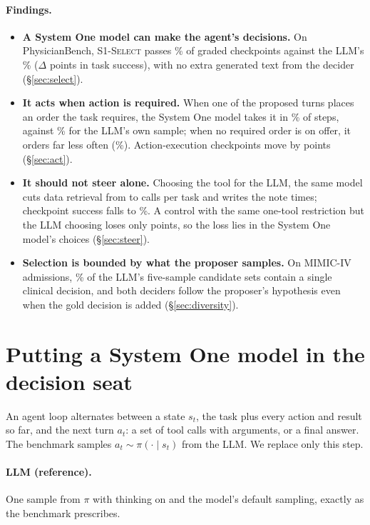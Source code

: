 \documentclass[11pt]{article}
\newcommand{\llm}{\textsc{LLM}}
\newcommand{\sel}{\textsc{S1-Select}}
\begin{document}
\paragraph{Findings.}
\begin{itemize}[leftmargin=*,itemsep=2pt,topsep=2pt]
  \item \textbf{A System One model can make the agent's decisions.} On PhysicianBench, \sel{} passes \PBcpSel\% of
  graded checkpoints against the LLM's \PBcpLLM\% ($\Delta$ \PBdiffSel{} points in task success), with no extra
  generated text from the decider (\S\ref{sec:select}).
  \item \textbf{It acts when action is required.} When one of the proposed turns places an order the task requires,
  the System One model takes it in \ONReqclef\% of steps, against \ONReqfirst\% for the LLM's own sample; when no
  required order is on offer, it orders far less often (\ONNoneclef\%). Action-execution checkpoints move by
  \PRSelLLMAE{} points (\S\ref{sec:act}).
  \item \textbf{It should not steer alone.} Choosing the tool for the LLM, the same model cuts data retrieval from
  \TLRetLLM{} to \TLRetTool{} calls per task and writes the note \TLDocTool{} times; checkpoint success falls to
  \PBcpTool\%. A control with the same one-tool restriction but the LLM choosing loses only \PRCtlLLMcp{} points, so
  the loss lies in the System One model's choices (\S\ref{sec:steer}).
  \item \textbf{Selection is bounded by what the proposer samples.} On MIMIC-IV admissions, \CEOneDecision\% of the
  LLM's five-sample candidate sets contain a single clinical decision, and both deciders follow the proposer's
  hypothesis even when the gold decision is added (\S\ref{sec:diversity}).
\end{itemize}

\section{Putting a System One model in the decision seat}\label{sec:protocol}

An agent loop alternates between a state $s_t$, the task plus every action and result so far, and the next turn
$a_t$: a set of tool calls with arguments, or a final answer. The benchmark samples $a_t \sim \pi(\cdot\mid s_t)$ from
the LLM. We replace only this step.

\paragraph{\llm{} (reference).} One sample from $\pi$ with thinking on and the model's default sampling, exactly as
the benchmark prescribes.
\end{document}
